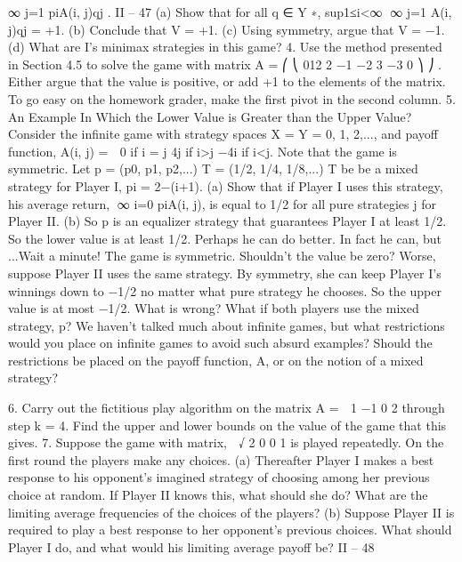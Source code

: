 \documentclass[]{report}
\begin{document}
∞
j=1
piA(i, j)qj .
II – 47
(a) Show that for all q ∈ Y ∗, sup1≤i<∞
∞
j=1 A(i, j)qj = +1.
(b) Conclude that V = +1.
(c) Using symmetry, argue that V = −1.
(d) What are I’s minimax strategies in this game?
4. Use the method presented in Section 4.5 to solve the game with matrix
A =
⎛
⎝
012
2 −1 −2
3 −3 0
⎞
⎠ .
Either argue that the value is positive, or add +1 to the elements of the matrix. To go
easy on the homework grader, make the first pivot in the second column.
5. An Example In Which the Lower Value is Greater than the Upper
Value? Consider the infinite game with strategy spaces X = Y = {0, 1, 2,...}, and payoff
function,
A(i, j) =  0 if i = j
4j if i>j
−4i if i<j.
Note that the game is symmetric. Let p = (p0, p1, p2,...)
T = (1/2, 1/4, 1/8,...)
T be be a
mixed strategy for Player I, pi = 2−(i+1).
(a) Show that if Player I uses this strategy, his average return, ∞
i=0 piA(i, j), is equal
to 1/2 for all pure strategies j for Player II.
(b) So p is an equalizer strategy that guarantees Player I at least 1/2. So the lower
value is at least 1/2. Perhaps he can do better. In fact he can, but ...Wait a minute! The
game is symmetric. Shouldn’t the value be zero? Worse, suppose Player II uses the same
strategy. By symmetry, she can keep Player I’s winnings down to −1/2 no matter what
pure strategy he chooses. So the upper value is at most −1/2. What is wrong? What
if both players use the mixed strategy, p? We haven’t talked much about infinite games,
but what restrictions would you place on infinite games to avoid such absurd examples?
Should the restrictions be placed on the payoff function, A, or on the notion of a mixed
strategy?

6. Carry out the fictitious play algorithm on the matrix A =
 1 −1
0 2
through step
k = 4. Find the upper and lower bounds on the value of the game that this gives.
7. Suppose the game with matrix,  √
2 0
0 1
is played repeatedly. On the first round
the players make any choices.
(a) Thereafter Player I makes a best response to his opponent’s imagined strategy of
choosing among her previous choice at random. If Player II knows this, what should she
do? What are the limiting average frequencies of the choices of the players?
(b) Suppose Player II is required to play a best response to her opponent’s previous
choices. What should Player I do, and what would his limiting average payoff be?
II – 48
\end{document}

